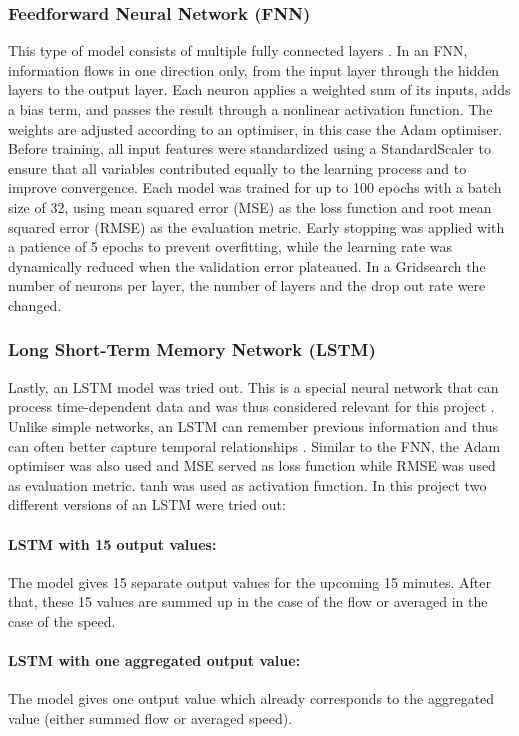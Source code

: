 	\subsubsection{Feedforward Neural Network (FNN)}
	This type of model consists of multiple fully connected layers \cite{book_aicourse}. In an FNN, information flows in one direction only, from the input layer through the hidden layers to the output layer. Each neuron applies a weighted sum of its inputs, adds a bias term, and passes the result through a nonlinear activation function.  The weights are adjusted according to an optimiser, in this case the Adam optimiser.
	Before training, all input features were standardized using a StandardScaler to ensure that all variables contributed equally to the learning process and to improve convergence.
	Each model was trained for up to 100 epochs with a batch size of 32, using mean squared error (MSE) as the loss function and root mean squared error (RMSE) as the evaluation metric.
	Early stopping was applied with a patience of 5 epochs to prevent overfitting, while the learning rate was dynamically reduced when the validation error plateaued.
	In a Gridsearch the number of neurons per layer, the number of layers and the drop out rate were changed.
	\subsubsection{Long Short-Term Memory Network (LSTM)}
	Lastly, an LSTM model was tried out. This is a special neural network that can process time-dependent data and was thus considered relevant for this project \cite{lstm_explanation}. Unlike simple networks, an LSTM can remember previous information and thus can often better capture temporal relationships \cite{differencefnnlstm}.\newline 
	Similar to the FNN, the Adam optimiser was also used and MSE served as loss function while RMSE was used as evaluation metric. tanh was used as activation function.
	In this project two different versions of an LSTM were tried out:
	\paragraph{LSTM with 15 output values:}
	The model gives 15 separate output values for the upcoming 15 minutes. After that, these 15 values are summed up in the case of the flow or averaged in the case of the speed.
	\paragraph{LSTM with one aggregated output value:}
	The model gives one output value which already corresponds to the aggregated value (either summed flow or averaged speed).
